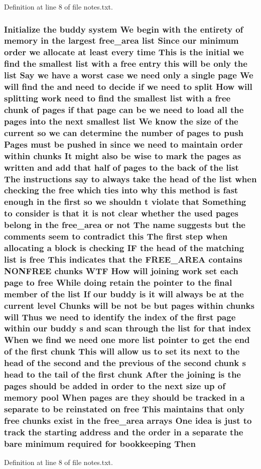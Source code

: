 Definition at line 8 of file notes.\+txt.

\subsubsection[{\texorpdfstring{Then}{Then}}]{\setlength{\rightskip}{0pt plus 5cm}Initialize the buddy system We begin with the entirety of memory {\bf in} the largest {\bf free\+\_\+area} {\bf list} Since our minimum {\bf order} we allocate at least every time This {\bf is} the initial we find the smallest {\bf list} with a free entry this will be only the {\bf list} Say we have a worst case we need only a single {\bf page} We will find the and need to decide if we need to {\bf split} How will splitting work need to find the smallest {\bf list} with a free {\bf chunk} of {\bf pages} if that {\bf page} can be we need to load all the {\bf pages} into the next smallest {\bf list} We know the size of the current {\bf so} we can determine the number of {\bf pages} to push Pages must be pushed {\bf in} since we need to maintain {\bf order} within chunks It might also be wise to mark the {\bf pages} as written and add that half of {\bf pages} to the back of the {\bf list} The instructions say to always take the head of the {\bf list} when checking the free which ties into why this method {\bf is} fast enough {\bf in} the {\bf first} {\bf so} we shouldn t violate that Something to consider {\bf is} that {\bf it} {\bf is} {\bf not} clear whether the used {\bf pages} belong {\bf in} the {\bf free\+\_\+area} or {\bf not} The name suggests but the comments seem to contradict this The {\bf first} step when allocating a block {\bf is} checking IF the head of the matching {\bf list} {\bf is} free This indicates that the F\+R\+E\+E\+\_\+\+A\+R\+EA contains N\+O\+N\+F\+R\+EE chunks W\+TF How will joining work set each {\bf page} to free While doing retain the pointer to the final member of the {\bf list} If our buddy {\bf is} {\bf it} will always be at the current level Chunks will be {\bf not} be but {\bf pages} within chunks will Thus we need to identify the index of the {\bf first} {\bf page} within our buddy s and scan through the {\bf list} for that index When we find we need one more {\bf list} pointer to get the end of the {\bf first} {\bf chunk} This will allow us to set its next to the head of the second and the previous of the second {\bf chunk} s head to the tail of the {\bf first} {\bf chunk} After the joining {\bf is} the {\bf pages} should be added {\bf in} {\bf order} to the next size up of memory pool When {\bf pages} are they should be tracked {\bf in} a separate to be reinstated on free This maintains that only free chunks exist {\bf in} the {\bf free\+\_\+area} arrays One idea {\bf is} just to track the starting address and the {\bf order} {\bf in} a separate the bare minimum required for bookkeeping Then}\hypertarget{notes_8txt_aa77f78242f5beeaae0c73ac608521b08}{}\label{notes_8txt_aa77f78242f5beeaae0c73ac608521b08}


Definition at line 8 of file notes.\+txt.

